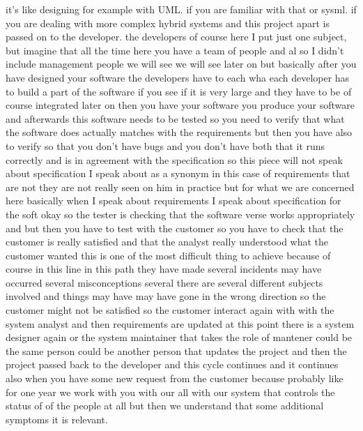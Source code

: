 \documentclass[conference, compsoc, twoside]{IEEEtran}
\begin{document}
it's like designing 
for example with UML. if you are familiar with that or sysml.
if you are dealing with more complex hybrid systems and this project apart is passed on to the developer.
 the developers of course here I put just one subject, but imagine that all the time here you have a team of people and al
so I didn't include management people we will see we will see later on but basically after you have designed your software the developers have to each wha each developer has to build a part of the software if you see if it is very large and they have to be of course integrated later on then you have your software you produce your software and afterwards this software needs to be tested so you need to verify that what the software does actually matches with the requirements but then you have also to verify so that you don't have bugs and you don't have both that it runs correctly and is in agreement with the specification so this piece will not speak about specification I speak about as a synonym in this case of requirements that are not they are not really seen on him in practice but for what we are concerned here basically when I speak about requirements I speak about specification for the soft okay so the tester is checking that the software verse works appropriately and but then you have to test with the customer so you have to check that the customer is really satisfied and that the analyst really understood what the customer wanted this is one of the most difficult thing to achieve because of course in this line in this path they have made several incidents may have occurred several misconceptions several there are several different subjects involved and things may have may have gone in the wrong direction so the customer might not be satisfied so the customer interact again with with the system analyst and then requirements are updated at this point there is a system designer again or the system maintainer that takes the role of mantener could be the same person could be another person that updates the project and then the project passed back to the developer and this cycle continues and it continues also when you have some new request from the customer because probably like for one year we work with you with our all with our system that controls the status of of the people at all but then we understand that some additional symptoms it is relevant.
 
\end{document}
